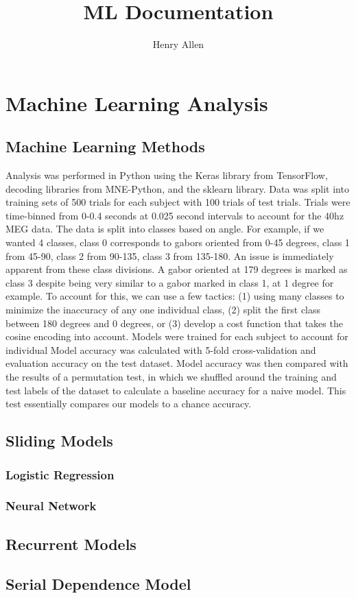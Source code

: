 \documentclass[12pt]{article}
\title{ML Documentation}
\author{Henry Allen}
\begin{document}
\maketitle
\section{Machine Learning Analysis}
\subsection{Machine Learning Methods}
Analysis was performed in Python using the Keras library from TensorFlow, decoding libraries
from MNE-Python, and the sklearn library. Data was split into training sets of 500 trials for
each subject with 100 trials of test trials. Trials were time-binned from 0-0.4 seconds at 0.025
second intervals to account for the 40hz MEG data. The data is split into classes based on angle.
For example, if we wanted 4 classes, class 0 corresponds to gabors oriented from 0-45 degrees,
class 1 from 45-90, class 2 from 90-135, class 3 from 135-180. An issue is immediately apparent from
these class divisions. A gabor oriented at 179 degrees is marked as class 3 despite being very similar
to a gabor marked in class 1, at 1 degree for example. To account for this, we can use a few tactics:
(1) using many classes to minimize the inaccuracy of any one individual class, (2) split the first class
between 180 degrees and 0 degrees, or (3) develop a cost function that takes the cosine encoding into account. 
Models were trained for each subject to account
for individual Model accuracy was calculated with 5-fold cross-validation and evaluation accuracy
on the test dataset. Model accuracy was then compared with the results of a permutation test, in
which we shuffled around the training and test labels of the dataset to calculate a baseline accuracy
for a naive model. This test essentially compares our models to a chance accuracy. 

\subsection{Sliding Models}
\subsubsection{Logistic Regression}


\subsubsection{Neural Network}

\subsection{Recurrent Models}

\subsection{Serial Dependence Model}
    
\end{document}
